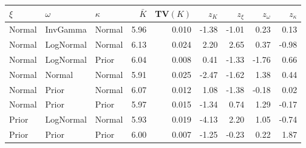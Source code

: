 \begin{tabular}{l l l r r r r r r}
  \toprule
  $\xi$ & $\omega$ & $\kappa$ & $\bar{K}$ & TV$(K)$ & $z_K$ & $z_\xi$ & $z_\omega$ & $z_\kappa$ \\
  \midrule
  Normal & InvGamma & Normal & 5.96 & 0.010 & -1.38 & -1.01 & 0.23 & 0.13 \\
  Normal & LogNormal & Normal & 6.13 & 0.024 & 2.20 & 2.65 & 0.37 & -0.98 \\
  Normal & LogNormal & Prior & 6.04 & 0.008 & 0.41 & -1.33 & -1.76 & 0.66 \\
  Normal & Normal & Normal & 5.91 & 0.025 & -2.47 & -1.62 & 1.38 & 0.44 \\
  Normal & Prior & Normal & 6.07 & 0.012 & 1.08 & -1.38 & -0.18 & 0.02 \\
  Normal & Prior & Prior & 5.97 & 0.015 & -1.34 & 0.74 & 1.29 & -0.17 \\
  Prior & LogNormal & Normal & 5.93 & 0.019 & -4.13 & 2.20 & 1.05 & -0.74 \\
  Prior & Prior & Prior & 6.00 & 0.007 & -1.25 & -0.23 & 0.22 & 1.87 \\
  \bottomrule
\end{tabular}
